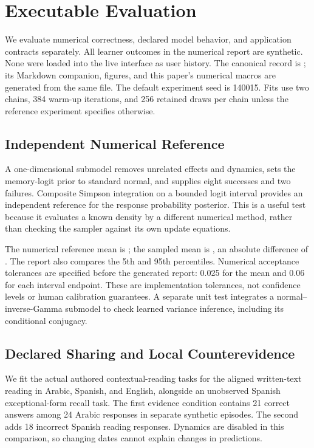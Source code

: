 \section{Executable Evaluation}
\label{sec:evaluation}

We evaluate numerical correctness, declared model behavior, and application
contracts separately. All learner outcomes in the numerical report are
synthetic. None were loaded into the live interface as user history.
The canonical record is
; its Markdown companion,
figures, and this paper's numerical macros are generated from the same file.
The default experiment seed is 140015. Fits use two chains, 384 warm-up
iterations, and 256 retained draws per chain unless the reference experiment
specifies otherwise.

\subsection{Independent Numerical Reference}

A one-dimensional submodel removes unrelated effects and dynamics, sets
the memory-logit prior to standard normal, and supplies eight successes and
two failures. Composite Simpson integration on a bounded logit interval
provides an independent reference for the response probability posterior.
This is a useful test because it evaluates a known density by a different
numerical method, rather than checking the sampler against its own update
equations.

The numerical reference mean is \LearnerReferenceMean{}; the sampled mean is
\LearnerSampledMean{}, an absolute difference of \LearnerReferenceError{}.
The report also compares the 5th and 95th percentiles. Numerical acceptance
tolerances are specified before the generated report: 0.025 for the mean and
0.06 for each interval endpoint. These are implementation tolerances, not
confidence levels or human calibration guarantees. A separate unit test
integrates a normal--inverse-Gamma submodel to check learned variance
inference, including its conditional conjugacy.

\subsection{Declared Sharing and Local Counterevidence}

We fit the actual authored contextual-reading tasks for the aligned
written-text reading in Arabic, Spanish, and English, alongside an unobserved
Spanish exceptional-form recall task. The first evidence condition contains
21 correct answers among 24 Arabic responses in separate synthetic episodes.
The second adds 18 incorrect Spanish reading responses. Dynamics are disabled
in this comparison, so changing dates cannot explain changes in predictions.

